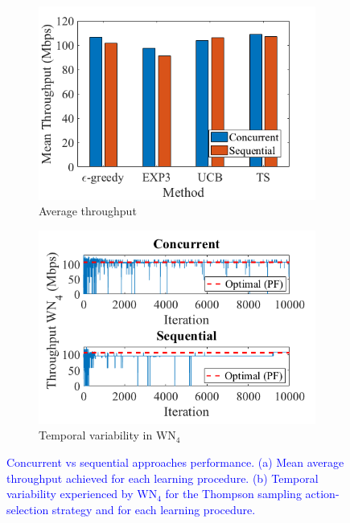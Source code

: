 \documentclass[preprint,12pt]{elsarticle}
\begin{document}
	\begin{figure}[t!]
		\centering	
		\begin{subfigure}[b]{0.44\textwidth}
			\includegraphics[width=\textwidth]{images/results_part_1_async_vs_sync}
			\caption{Average throughput}
			\label{fig:results_part_1_async_vs_sync_meant_tpt}
		\end{subfigure}
		\begin{subfigure}[b]{0.44\textwidth}
			\includegraphics[width=\textwidth]{images/results_part_1_async_vs_sync_variability}
			\caption{Temporal variability in $\text{WN}_4$}
			\label{fig:results_part_1_async_vs_sync_variability}
		\end{subfigure}
		\caption{\textcolor{blue}{Concurrent vs sequential approaches performance. (a) Mean average throughput achieved for each learning procedure. (b) Temporal variability experienced by $\text{WN}_4$ for the Thompson sampling action-selection strategy and for each learning procedure.}}
		\label{fig:results_part_1_async_vs_sync}
	\end{figure}
	
\end{document}
